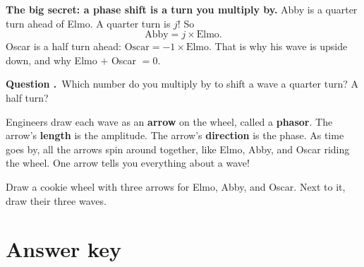 \documentclass[12pt,letterpaper]{article}
\newcommand{\blank}[1][3cm]{\underline{\hspace{#1}}}
\newcounter{question}
\newcommand{\question}{%
  \refstepcounter{question}\par\needspace{3\baselineskip}%
  \textbf{\color{monster}Question \arabic{question}.}~}
\begin{document}
\begin{bigidea}
\textbf{The big secret: a phase shift is a turn you multiply by.} Abby is a quarter turn ahead
of Elmo. A quarter turn is $j$! So
\[
  \text{Abby} = j \times \text{Elmo}.
\]
Oscar is a half turn ahead: $\text{Oscar} = -1 \times \text{Elmo}$. That is why his wave is
upside down, and why Elmo $+$ Oscar $= 0$.
\end{bigidea}

\question Which number do you multiply by to shift a wave a quarter turn? \blank[1.5cm]
\quad A half turn? \blank[1.5cm]

\begin{center}
\end{center}

\begin{bigidea}
Engineers draw each wave as an \textbf{arrow} on the wheel, called a \textbf{phasor}. The arrow's
\textbf{length} is the amplitude. The arrow's \textbf{direction} is the phase. As time goes by,
all the arrows spin around together, like Elmo, Abby, and Oscar riding the wheel. One arrow tells you
everything about a wave!
\end{bigidea}

\begin{tcolorbox}[enhanced, colback=white, colframe=monster, boxrule=1pt, arc=3mm,
  height=3cm, title={\textbf{Draw it!}}, colbacktitle=monster, coltitle=white]
Draw a cookie wheel with three arrows for Elmo, Abby, and Oscar. Next to it, draw their three waves.
\end{tcolorbox}

\newpage
\section{Answer key}
\end{document}
